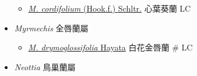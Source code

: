 \begin{itemize}
  \begin{itemize}
        \item[] \href{http://www.theplantlist.org/tpl1.1/search?q=Mischobulbum+cordifolium}{\textit{M. cordifolium} (Hook.f.) Schltr.}   心葉葵蘭   LC
  \end{itemize}
 \item[] \textit{Myrmechis} 全唇蘭屬
                                
  \begin{itemize}
        \item[] \href{http://www.theplantlist.org/tpl1.1/search?q=Myrmechis+drymoglossifolia}{\textit{M. drymoglossifolia} Hayata}   白花金唇蘭  \# LC
  \end{itemize}
 \item[] \textit{Neottia} 鳥巢蘭屬
                                

\end{itemize}
